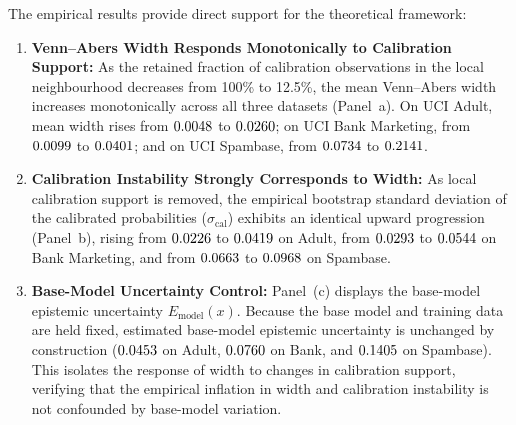 \documentclass[11pt]{article}
\begin{document}
	The empirical results provide direct support for the theoretical framework:
	\begin{enumerate}
		\item \textbf{Venn--Abers Width Responds Monotonically to Calibration Support:} As the retained fraction of calibration observations in the local neighbourhood decreases from 100\% to 12.5\%, the mean Venn--Abers width increases monotonically across all three datasets (Panel~a). On UCI Adult, mean width rises from $0.0048{}$ to $0.0260{}$; on UCI Bank Marketing, from $0.0099{}$ to $0.0401{}$; and on UCI Spambase, from $0.0734{}$ to $0.2141{}$.
		\item \textbf{Calibration Instability Strongly Corresponds to Width:} As local calibration support is removed, the empirical bootstrap standard deviation of the calibrated probabilities ($\sigma_{\mathrm{cal}}$) exhibits an identical upward progression (Panel~b), rising from $0.0226{}$ to $0.0419{}$ on Adult, from $0.0293{}$ to $0.0544{}$ on Bank Marketing, and from $0.0663{}$ to $0.0968{}$ on Spambase.
		\item \textbf{Base-Model Uncertainty Control:} Panel~(c) displays the base-model epistemic uncertainty $E_{\mathrm{model}}(x)$. Because the base model and training data are held fixed, estimated base-model epistemic uncertainty is unchanged by construction ($0.0453{}$ on Adult, $0.0760{}$ on Bank, and $0.1405{}$ on Spambase). This isolates the response of width to changes in calibration support, verifying that the empirical inflation in width and calibration instability is not confounded by base-model variation.
	\end{enumerate}
\end{document}
